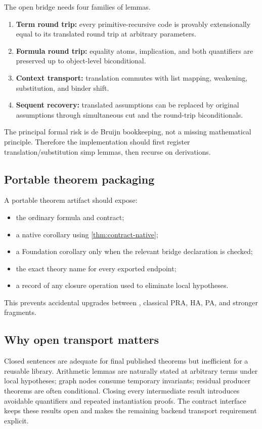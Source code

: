 The open bridge needs four families of lemmas.
\begin{enumerate}
  \item \textbf{Term round trip:} every primitive-recursive code is provably extensionally equal to its translated round trip at arbitrary parameters.
  \item \textbf{Formula round trip:} equality atoms, implication, and both quantifiers are preserved up to object-level biconditional.
  \item \textbf{Context transport:} translation commutes with list mapping, weakening, substitution, and binder shift.
  \item \textbf{Sequent recovery:} translated assumptions can be replaced by original assumptions through simultaneous cut and the round-trip biconditionals.
\end{enumerate}
The principal formal risk is de Bruijn bookkeeping, not a missing mathematical principle.  Therefore the implementation should first register translation/substitution simp lemmas, then recurse on derivations.

\subsection{Portable theorem packaging}

A portable theorem artifact should expose:
\begin{itemize}
  \item the ordinary formula and contract;
  \item a native corollary using \cref{thm:contract-native};
  \item a Foundation corollary only when the relevant bridge declaration is checked;
  \item the exact theory name for every exported endpoint;
  \item a record of any closure operation used to eliminate local hypotheses.
\end{itemize}
This prevents accidental upgrades between \iPRA, classical PRA, HA, PA, and stronger fragments.

\subsection{Why open transport matters}

Closed sentences are adequate for final published theorems but inefficient for a reusable library.  Arithmetic lemmas are naturally stated at arbitrary terms under local hypotheses; graph nodes consume temporary invariants; residual producer theorems are often conditional.  Closing every intermediate result introduces avoidable quantifiers and repeated instantiation proofs.  The contract interface keeps these results open and makes the remaining backend transport requirement explicit.
